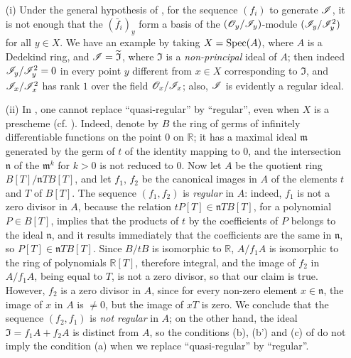 \begin{remarks}[16.9.6]
\label{IV.16.9.6}
\begin{enumerate}
  \item[\rm{(i)}] Under the general hypothesis of , for the sequence $(f_i)$ to generate $\mathscr{I}$, it is not enough that the $(\bar f_i)_y$ form a basis of the $(\mathscr{O}_y/\mathscr{I}_y)$-module $(\mathscr{I}_y/\mathscr{I}_y^2)$ for all $y \in X$.
  We have an example by 
  taking  $X = \operatorname{Spec}(A)$, where $A$ is a Dedekind ring, and $\mathscr{I} = \widetilde{\mathfrak{I}}$, where $\mathfrak{I}$ is a \emph{non-principal} ideal of $A$;
  then indeed $\mathscr{I}_y/\mathscr{I}_y^2 = 0$ in every point $y$ different from $x \in X$ corresponding to $\mathfrak{I}$, and $\mathscr{I}_x/\mathscr{I}_x^2$ has rank $1$ over the field $\mathscr{O}_x/\mathscr{I}_x$;
  also, $\mathscr{I}$ is evidently a regular ideal.

  \item[\rm{(ii)}] In , one cannot replace ``quasi-regular'' by ``regular'', even when $X$ is a prescheme (cf. ).
  Indeed, denote by $B$ the ring of germs of infinitely differentiable functions on the point $0$ on $\mathbb{R}$; 
  it has a maximal ideal $\mathfrak{m}$ generated by the germ of $t$ of the identity mapping to $0$, and the intersection $\mathfrak{n}$ of the $\mathfrak{m}^k$ for $k>0$ is not reduced to $0$.
  Now let $A$ be the quotient ring $B[T]/\mathfrak{n}TB[T]$, and let $f_1$, $f_2$ be the canonical images in $A$ of the elements $t$ and $T$ of $B[T]$.
  The sequence $(f_1, f_2)$ is \emph{regular} in $A$: indeed, $f_1$ is not a zero divisor in $A$, because the relation $tP[T] \in \mathfrak{n}TB[T]$, for a polynomial $P \in B[T]$, implies that the products of $t$ by the coefficients of $P$ belongs to the ideal $\mathfrak{n}$, and it results immediately that the coefficients are the same in $\mathfrak{n}$, so $P[T] \in \mathfrak{n}TB[T]$.
  Since $B/tB$ is isomorphic to $\mathbb{R}$, $A/f_1A$ is isomorphic to the ring of polynomials $\mathbb{R}[T]$, therefore integral, and the image of $f_2$ in $A/f_1A$, being equal to $T$, is not a zero divisor, so that our claim is true.
  However, $f_2$ is a zero divisor in $A$, since for every non-zero element $x \in \mathfrak{n}$, the image of $x$ in $A$ is $\neq 0$, but the image of $xT$ is zero.
  We conclude that the sequence $(f_2, f_1)$ is \emph{not regular} in $A$;
  on the other hand, the ideal $\mathfrak{I} = f_1A + f_2A$ is distinct from $A$, so the conditions (b), (b') and (c) of  do not imply the condition (a) when we replace ``quasi-regular'' by ``regular''.
\end{enumerate}
\end{remarks}

